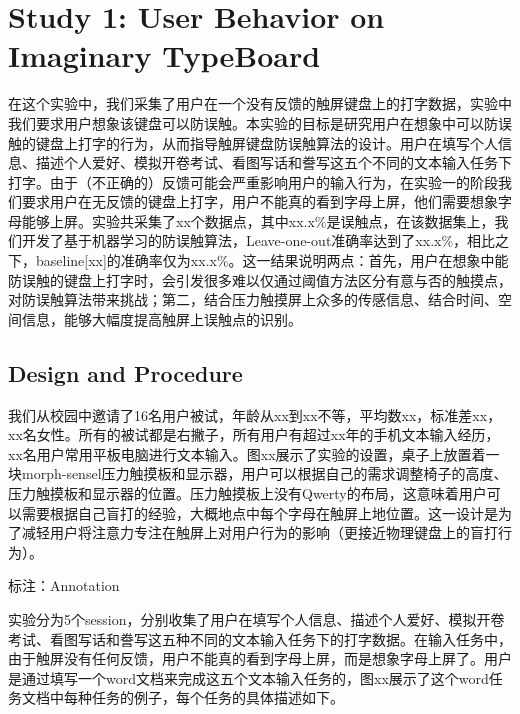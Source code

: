 \section{Study 1: User Behavior on Imaginary TypeBoard}

在这个实验中，我们采集了用户在一个没有反馈的触屏键盘上的打字数据，实验中我们要求用户想象该键盘可以防误触。本实验的目标是研究用户在想象中可以防误触的键盘上打字的行为，从而指导触屏键盘防误触算法的设计。用户在填写个人信息、描述个人爱好、模拟开卷考试、看图写话和誊写这五个不同的文本输入任务下打字。由于（不正确的）反馈可能会严重影响用户的输入行为，在实验一的阶段我们要求用户在无反馈的键盘上打字，用户不能真的看到字母上屏，他们需要想象字母能够上屏。实验共采集了xx个数据点，其中xx.x\%是误触点，在该数据集上，我们开发了基于机器学习的防误触算法，Leave-one-out准确率达到了xx.x\%，相比之下，baseline[xx]的准确率仅为xx.x\%。这一结果说明两点：首先，用户在想象中能防误触的键盘上打字时，会引发很多难以仅通过阈值方法区分有意与否的触摸点，对防误触算法带来挑战；第二，结合压力触摸屏上众多的传感信息、结合时间、空间信息，能够大幅度提高触屏上误触点的识别。

\subsection{Design and Procedure}

我们从校园中邀请了16名用户被试，年龄从xx到xx不等，平均数xx，标准差xx，xx名女性。所有的被试都是右撇子，所有用户有超过xx年的手机文本输入经历，xx名用户常用平板电脑进行文本输入。图xx展示了实验的设置，桌子上放置着一块morph-sensel压力触摸板和显示器，用户可以根据自己的需求调整椅子的高度、压力触摸板和显示器的位置。压力触摸板上没有Qwerty的布局，这意味着用户可以需要根据自己盲打的经验，大概地点中每个字母在触屏上地位置。这一设计是为了减轻用户将注意力专注在触屏上对用户行为的影响（更接近物理键盘上的盲打行为）。

标注：Annotation

实验分为5个session，分别收集了用户在填写个人信息、描述个人爱好、模拟开卷考试、看图写话和誊写这五种不同的文本输入任务下的打字数据。在输入任务中，由于触屏没有任何反馈，用户不能真的看到字母上屏，而是想象字母上屏了。用户是通过填写一个word文档来完成这五个文本输入任务的，图xx展示了这个word任务文档中每种任务的例子，每个任务的具体描述如下。

